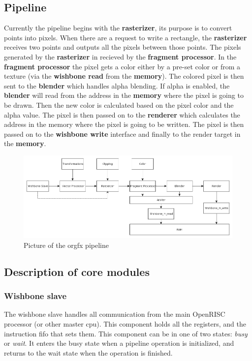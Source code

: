 \documentclass[10pt,a4paper]{article}
\begin{document}
\subsection{Pipeline}
Currently the pipeline begins with the \textbf{rasterizer}, its purpose is to convert points into pixels. When there are a request to write a rectangle, the \textbf{rasterizer} receives two points and outputs all the pixels between those points. The pixels generated by the \textbf{rasterizer} in recieved by the \textbf{fragment processor}. In the \textbf{fragment processor} the pixel gets a color either by a pre-set color or from a texture (via the \textbf{wishbone read} from the \textbf{memory}). The colored pixel is then sent to the \textbf{blender} which handles alpha blending. If alpha is enabled, the \textbf{blender} will read from the address in the \textbf{memory} where the pixel is going to be drawn. Then the new color is calculated based on the pixel color and the alpha value. The pixel is then passed on to the \textbf{renderer} which calculates the address in the memory where the pixel is going to be written. The pixel is then passed on to the \textbf{wishbone write} interface and finally to the render target in the \textbf{memory}.

\begin{figure}
\begin{center}
\includegraphics[scale=0.35]{../pictures/pipeline}
\caption{Picture of the orgfx pipeline}
\label{fig:pipeline}
\end{center}
\end{figure}

\subsection{Description of core modules}

\subsubsection{Wishbone slave}
The wishbone slave handles all communication from the main OpenRISC processor (or other master cpu). This component holds all the registers, and the instruction fifo that sets them. This component can be in one of two states: \textit{busy} or \textit{wait}. It enters the busy state when a pipeline operation is initialized, and returns to the wait state when the operation is finished.
\end{document}
